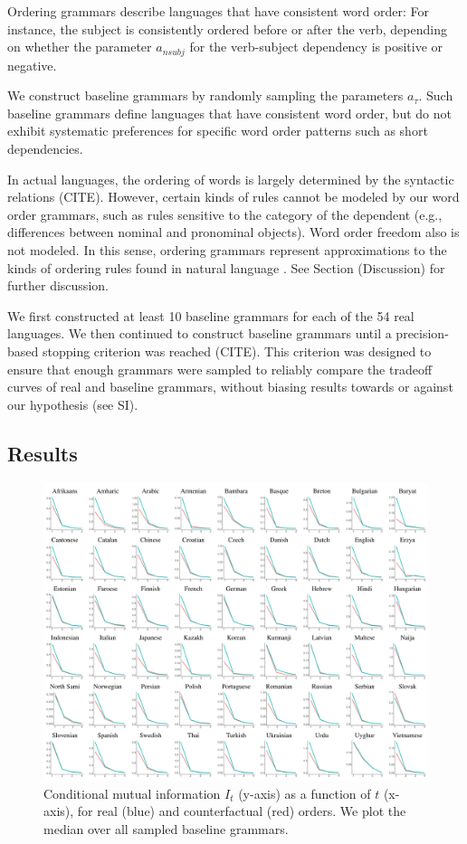 Ordering grammars describe languages that have consistent word order:
For instance, the subject is consistently ordered before or after the verb, depending on whether the parameter $a_{nsubj}$ for the verb-subject dependency is positive or negative.

We construct baseline grammars by randomly sampling the parameters $a_\tau$.
Such baseline grammars define languages that have consistent word order, but do not exhibit systematic preferences for specific word order patterns such as short dependencies.


In actual languages, the ordering of words is largely determined by the syntactic relations (CITE).
However, certain kinds of rules cannot be modeled by our word order grammars, such as rules sensitive to the category of the dependent (e.g., differences between nominal and pronominal objects).
Word order freedom also is not modeled.
In this sense, ordering grammars represent approximations to the kinds of ordering rules found in natural language \citep{gildea-optimizing-2007, gildea-grammars-2010, gildea-human-2015}.
See Section (Discussion) for further discussion.


We first constructed at least 10 baseline grammars for each of the 54 real languages.
We then continued to construct baseline grammars until a precision-based stopping criterion was reached (CITE). This criterion was designed to ensure that enough grammars were sampled to reliably compare the tradeoff curves of real and baseline grammars, without biasing results towards or against our hypothesis (see SI).

\subsection{Results}

\begin{figure}
	\begin{center}
\includegraphics[width=\textwidth]{it-table.pdf}
\end{center}
	\caption{Conditional mutual information $I_t$ (y-axis) as a function of $t$ (x-axis), for real (blue) and counterfactual (red) orders. We plot the median over all sampled baseline grammars.}\label{fig:it}
\end{figure}




